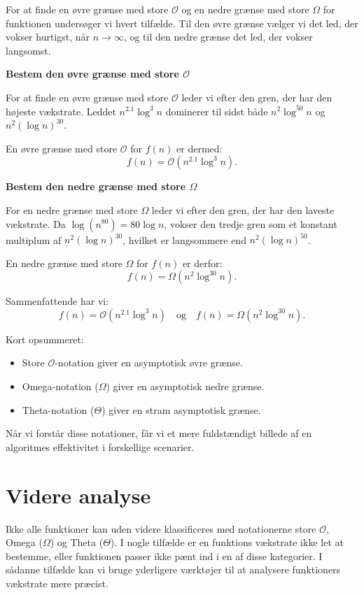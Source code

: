     \begin{solution}
        For at finde en øvre grænse med store $\mathcal{O}$ og en nedre grænse med store $\Omega$ for funktionen undersøger vi hvert tilfælde. Til den øvre grænse vælger vi det led, der vokser hurtigst, når \( n \to \infty \), og til den nedre grænse det led, der vokser langsomst.
        
        \textbf{Bestem den øvre grænse med store $\mathcal{O}$}
        
        For at finde en øvre grænse med store $\mathcal{O}$ leder vi efter den gren, der har den højeste vækstrate. Leddet \(n^{2.1}\log^3 n\) dominerer til sidst både \(n^2\log^{50}n\) og \(n^2(\log n)^{30}\).
        
        En øvre grænse med store $\mathcal{O}$ for \( f(n) \) er dermed:
        \[
        f(n) = \mathcal{O}(n^{2.1} \log^3 n).
        \]
        
        \textbf{Bestem den nedre grænse med store $\Omega$}
        
        For en nedre grænse med store $\Omega$ leder vi efter den gren, der har den laveste vækstrate. Da $\log(n^{80})=80\log n$, vokser den tredje gren som et konstant multiplum af \(n^2(\log n)^{30}\), hvilket er langsommere end \(n^2(\log n)^{50}\).
        
        En nedre grænse med store $\Omega$ for \( f(n) \) er derfor:
        \[
        f(n) = \Omega(n^2 \log^{30} n).
        \]
        
        Sammenfattende har vi:
        \[
        f(n) = \mathcal{O}(n^{2.1} \log^3 n) \quad \text{og} \quad f(n) = \Omega(n^2 \log^{30} n).
        \]\end{solution}

Kort opsummeret:
\begin{itemize}
    \item Store $\mathcal{O}$-notation giver en asymptotisk øvre grænse.
    \item Omega-notation ($\Omega$) giver en asymptotisk nedre grænse.
    \item Theta-notation ($\Theta$) giver en stram asymptotisk grænse.
\end{itemize}

Når vi forstår disse notationer, får vi et mere fuldstændigt billede af en algoritmes effektivitet i forskellige scenarier.

\section{Videre analyse}
Ikke alle funktioner kan uden videre klassificeres med notationerne store $\mathcal{O}$, Omega ($\Omega$) og Theta ($\Theta$). I nogle tilfælde er en funktions vækstrate ikke let at bestemme, eller funktionen passer ikke pænt ind i en af disse kategorier. I sådanne tilfælde kan vi bruge yderligere værktøjer til at analysere funktioners vækstrate mere præcist.

